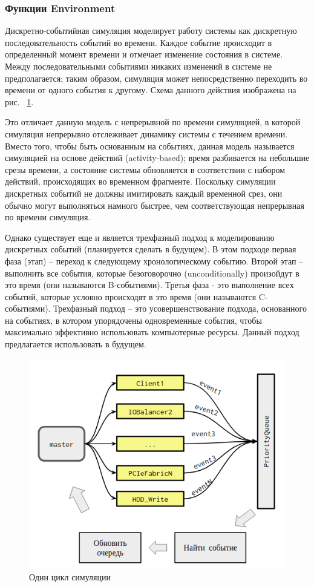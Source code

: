 \subsubsection{Функции Environment}
\par 
Дискретно-событийная симуляция моделирует работу системы как дискретную последовательность событий во времени. Каждое событие происходит в определенный момент времени и отмечает изменение состояния в системе. Между последовательными событиями никаких изменений в системе не предполагается; таким образом, симуляция может непосредственно переходить во времени от одного события к другому. Схема данного действия изображена на рис. ~\ref{fig:loop}.
\par 
Это отличает данную модель с непрерывной по времени симуляцией, в которой симуляция непрерывно отслеживает динамику системы с течением времени. Вместо того, чтобы быть основанным на событиях, данная модель называется симуляцией на основе действий (activity-based); время разбивается на небольшие срезы времени, а состояние системы обновляется в соответствии с набором действий, происходящих во временном фрагменте. Поскольку симуляции дискретных событий не должны имитировать каждый временной срез, они обычно могут выполняться намного быстрее, чем соответствующая непрерывная по времени симуляция.
\par 
Однако существует еще и является трехфазный подход к моделированию дискретных событий (планируется сделать в будущем). В этом подходе первая фаза (этап) -- переход к следующему хронологическому событию. Второй этап -- выполнить все события, которые безоговорочно (unconditionally) произойдут в это время (они называются B-событиями). Третья фаза - это выполнение всех событий, которые условно происходят в это время (они называются C-событиями). Трехфазный подход -- это усовершенствование подхода, основанного на событиях, в котором упорядочены одновременные события, чтобы максимально эффективно использовать компьютерные ресурсы. Данный подход предлагается использовать в будущем.

\begin{figure}[!ht]
\centering
\includegraphics[width=\textwidth]{Kenenbek/images/loop.png}
\caption{Один цикл симуляции}
\label{fig:loop}
\end{figure}  

